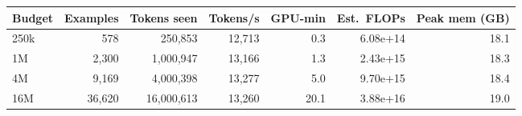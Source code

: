 \begin{tabular}{lrrrrrr}
\toprule
Budget & Examples & Tokens seen & Tokens/s & GPU-min & Est.\ FLOPs & Peak mem (GB) \\
\midrule
250k & 578 & 250,853 & 12,713 & 0.3 & 6.08e+14 & 18.1 \\
1M & 2,300 & 1,000,947 & 13,166 & 1.3 & 2.43e+15 & 18.3 \\
4M & 9,169 & 4,000,398 & 13,277 & 5.0 & 9.70e+15 & 18.4 \\
16M & 36,620 & 16,000,613 & 13,260 & 20.1 & 3.88e+16 & 19.0 \\
\bottomrule
\end{tabular}